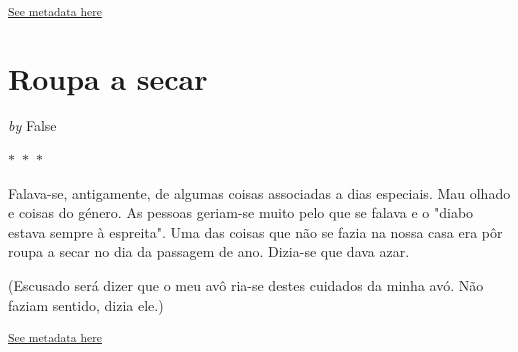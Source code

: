 \documentclass{article}
\begin{document}
    
        \textsuperscript{\hyperref[table:\arabic{tablecounter}]{See metadata here}}
    


\newpage
\section{Roupa a secar}


    
        \textit{by} False
    


 
    

    $\ast$~$\ast$~$\ast$  


    \begin{center}
        \begin{minipage}{0.9\textwidth}
            \setlength{\parskip}{0.2cm}
            \setlength{\parindent}{0cm}
            \fontsize{12pt}{14pt}\selectfont
            


Falava-se, antigamente, de algumas coisas associadas a dias especiais.
Mau olhado e coisas do género. As pessoas geriam-se muito pelo que se
falava e o "diabo estava sempre à espreita". Uma das coisas que não se
fazia na nossa casa era pôr roupa a secar no dia da passagem de ano.
Dizia-se que dava azar.

(Escusado será dizer que o meu avô ria-se destes cuidados da minha avó. Não
faziam sentido, dizia ele.)

        \end{minipage}
    \end{center}

    
        \textsuperscript{\hyperref[table:\arabic{tablecounter}]{See metadata here}}
    
\end{document}
